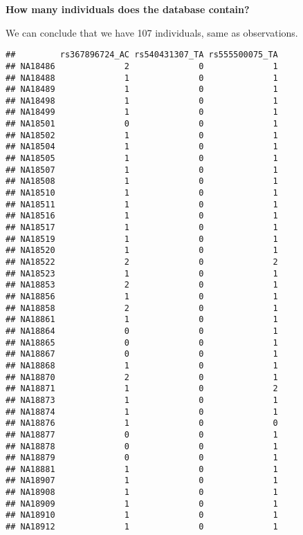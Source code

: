 \documentclass[]{article}
\begin{document}
\textbf{How many individuals does the database contain?}

We can conclude that we have 107 individuals, same as observations.

\begin{verbatim}
##         rs367896724_AC rs540431307_TA rs555500075_TA
## NA18486              2              0              1
## NA18488              1              0              1
## NA18489              1              0              1
## NA18498              1              0              1
## NA18499              1              0              1
## NA18501              0              0              1
## NA18502              1              0              1
## NA18504              1              0              1
## NA18505              1              0              1
## NA18507              1              0              1
## NA18508              1              0              1
## NA18510              1              0              1
## NA18511              1              0              1
## NA18516              1              0              1
## NA18517              1              0              1
## NA18519              1              0              1
## NA18520              1              0              1
## NA18522              2              0              2
## NA18523              1              0              1
## NA18853              2              0              1
## NA18856              1              0              1
## NA18858              2              0              1
## NA18861              1              0              1
## NA18864              0              0              1
## NA18865              0              0              1
## NA18867              0              0              1
## NA18868              1              0              1
## NA18870              2              0              1
## NA18871              1              0              2
## NA18873              1              0              1
## NA18874              1              0              1
## NA18876              1              0              0
## NA18877              0              0              1
## NA18878              0              0              1
## NA18879              0              0              1
## NA18881              1              0              1
## NA18907              1              0              1
## NA18908              1              0              1
## NA18909              1              0              1
## NA18910              1              0              1
## NA18912              1              0              1

\end{verbatim}
\end{document}
